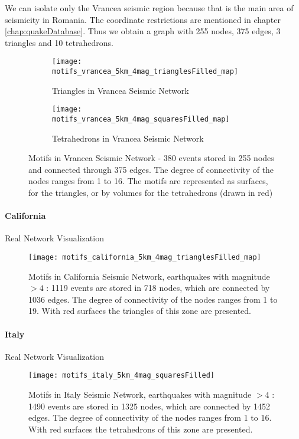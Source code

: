 We can isolate only the Vrancea seismic region because that is the main area of seismicity in Romania. The coordinate restrictions are mentioned in chapter \ref{chap:quakeDatabase}. Thus we obtain a graph with 255 nodes, 375 edges, 3 triangles and 10 tetrahedrons.
\begin{figure}[!h]
\begin{subfigure}{.5\textwidth}
  \centering
  \texttt{[image: motifs\_vrancea\_5km\_4mag\_trianglesFilled\_map]}
  \caption{Triangles in Vrancea Seismic Network}
  \label{fig:motifTriangleVrancea}
\end{subfigure}%
\begin{subfigure}{.5\textwidth}
  \centering
  \texttt{[image: motifs\_vrancea\_5km\_4mag\_squaresFilled\_map]}
  \caption{Tetrahedrons in Vrancea Seismic Network}
  \label{fig:motifTetrahedronVrancea}
\end{subfigure}
\caption{Motifs in Vrancea Seismic Network - 380 events stored in 255 nodes and connected through 375 edges. The degree of connectivity of the nodes ranges from 1 to 16. The motifs are represented as surfaces, for the triangles, or by volumes for the tetrahedrons (drawn in red)}
\label{fig:volumesVrancea}
\end{figure}


\clearpage
\paragraph{California}  Real Network Visualization 

\begin{figure}[!h]
  \centering
  \texttt{[image: motifs\_california\_5km\_4mag\_trianglesFilled\_map]}
  \caption{Motifs in California Seismic Network, earthquakes with magnitude $>4$ : 1119 events are stored in 718 nodes, which are connected by 1036 edges. The degree of connectivity of the nodes ranges from 1 to 19. With red surfaces the triangles of this zone are presented.}
  \label{fig:motifCalifornia}
\end{figure}


\paragraph{Italy} Real Network Visualization 

\begin{figure}[!h]
  \centering
  \texttt{[image: motifs\_italy\_5km\_4mag\_squaresFilled]}
  \caption{Motifs in Italy Seismic Network, earthquakes with magnitude $>4$ : 1490 events are stored in 1325 nodes, which are connected by 1452 edges. The degree of connectivity of the nodes ranges from 1 to 16. With red surfaces the tetrahedrons of this zone are presented.}
  \label{fig:motifItaly}
\end{figure}

